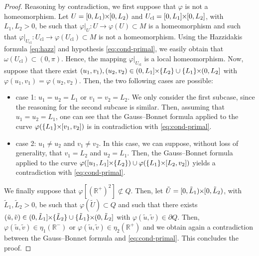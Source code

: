 \documentclass{article}
\newcommand{\PLH}{{\mkern-1mu\times\mkern-1mu}}
\newcommand{\Times}{\PLH}
\newcommand{\R}{\mathbb{R}}
\newcommand{\surf}{M}
\newcommand{\sect}{Q}
\theoremstyle{remark}
\theoremstyle{prpart}
\begin{document}
\begin{proof}
Reasoning by contradiction, we first suppose that $\varphi$ is not a homeomorphism. Let $U = [0,L_1)\Times [0,L_2)$ and $U_{\mathrm{cl}} = [0,L_1]\Times [0,L_2]$, with $L_1,L_2>0$,  be such that $\varphi\big|_{U} : U\to \varphi(U)\subset \surf$ is a homeomorphism and such that $\varphi\big|_{U_{\mathrm{cl}}}: U_{\mathrm{cl}}\to\varphi(U_{\mathrm{cl}})\subset\surf$ is not a homeomorphism. Using the Hazzidakis formula \eqref{eq:hazz} and hypothesis \eqref{eq:cond-primal}, we easily obtain that $\omega(U_\mathrm{cl})\subset (0,\pi)$. Hence, the mapping $\varphi\big|_{U_{\mathrm{cl}}}$ is a local homeomorphism.
Now, suppose that there exist $(u_1,v_1),(u_2,v_2)\in(0,L_1]\Times\{L_2\}\cup\{L_1\}\Times(0,L_2]$ with $\varphi(u_1,v_1) = \varphi(u_2,v_2)$. Then, the two following cases are possible:
\begin{itemize}
\item case 1: $u_1=u_2=L_1$ or $v_1=v_2=L_2$. We only consider the first subcase, since the reasoning for the second subcase is similar. Then, assuming that $u_1=u_2=L_1$, one can see that the Gauss--Bonnet formula applied to the curve $\varphi(\{L_1\}\Times[v_1,v_2])$ is in contradiction with \eqref{eq:cond-primal}.
\item case 2: $u_1\neq u_2$ and $v_1\neq v_2$. In this case, we can suppose, without loss of generality, that $v_1=L_2$ and $u_2=L_1$. Then, the Gauss--Bonnet formula applied to the curve $\varphi([u_1,L_1]\Times\{L_2\})\cup\varphi(\{L_1\}\Times[L_2,v_2])$ yields a contradiction with \eqref{eq:cond-primal}.
\end{itemize}
We finally suppose that $\varphi[(\R^+)^2]\not\subset \sect$. Then, let $\tilde U = [0,\tilde L_1)\Times [0,\tilde L_2)$, with $\tilde L_1,\tilde L_2>0$, be such that $\varphi(\tilde U)\subset\sect$ and such that there exists $(\tilde u,\tilde v)\in(0,\tilde L_1]\Times\{\tilde L_2\}\cup\{\tilde L_1\}\Times(0,\tilde L_2]$ with $\varphi(\tilde u,\tilde v)\in\partial \sect$. Then, $\varphi(\tilde u, \tilde v)\in\eta_1(\R^-)$ or $\varphi(\tilde u, \tilde v)\in\eta_2(\R^+)$ and we obtain again a contradiction between the Gauss--Bonnet formula and \eqref{eq:cond-primal}. This concludes the proof.
\end{proof} 

\newsavebox\myboxa
\newsavebox\myboxb
\newsavebox\myboxc
\newsavebox\boxskeleton
\end{document}
